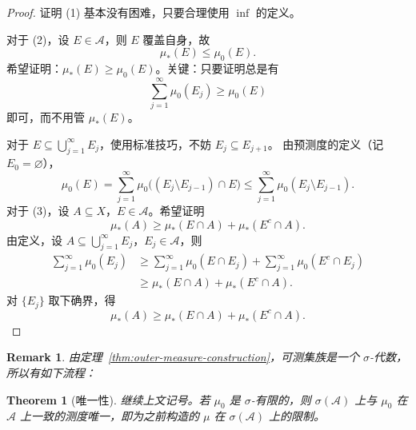 \documentclass[12pt,letterpaper,twoside,openright]{ctexbook}
\theoremstyle{bluehead}
\newtheorem{theorem}{Theorem}
\theoremstyle{olivehead}
\theoremstyle{orangehead}
\theoremstyle{redremark}
\newtheorem*{remark}{Remark}
\begin{document}
\begin{proof}
证明 \textup{(1)} 基本没有困难，只要合理使用 $\inf$ 的定义。

对于 \textup{(2)}，设 $E\in\mathcal{A}$，则 $E$ 覆盖自身，故
\[
  \mu_*(E)\leq\mu_0(E).
\]
希望证明：$\mu_*(E)\geq\mu_0(E)$。关键：只要证明总是有
\[
  \sum_{j=1}^{\infty}\mu_0(E_j)\geq\mu_0(E)
\]
即可，而不用管 $\mu_*(E)$。

对于 $E\subseteq\bigcup_{j=1}^{\infty}E_j$，使用标准技巧，不妨 $E_j\subseteq E_{j+1}$。
由预测度的定义（记 $E_0=\varnothing$），
\[
  \mu_0(E)
  =\sum_{j=1}^{\infty}\mu_0\bigl((E_j\setminus E_{j-1})\cap E\bigr)
  \leq\sum_{j=1}^{\infty}\mu_0(E_j\setminus E_{j-1}).
\]
对于 \textup{(3)}，设 $A\subseteq X$，$E\in\mathcal{A}$。希望证明
\[
  \mu_*(A)\geq\mu_*(E\cap A)+\mu_*(E^c\cap A).
\]
由定义，设 $A\subseteq\bigcup_{j=1}^{\infty}E_j$，$E_j\in\mathcal{A}$，则
\[
\begin{aligned}
  \sum_{j=1}^{\infty}\mu_0(E_j)
  &\geq\sum_{j=1}^{\infty}\mu_0(E\cap E_j)
      +\sum_{j=1}^{\infty}\mu_0(E^c\cap E_j)\\
  &\geq\mu_*(E\cap A)+\mu_*(E^c\cap A).
\end{aligned}
\]
对 $\{E_j\}$ 取下确界，得
\[
  \mu_*(A)\geq\mu_*(E\cap A)+\mu_*(E^c\cap A).
\]
\end{proof}
\begin{remark}
由定理~\ref{thm:outer-measure-construction}，可测集族是一个 $\sigma$-代数，所以有如下流程：
\begin{center}
\end{center}
\end{remark}
\begin{theorem}[唯一性]\label{thm:measure-extension-uniqueness}
继续上文记号。若 $\mu_0$ 是 $\sigma$-有限的，则 $\sigma(\mathcal{A})$ 上与 $\mu_0$ 在 $\mathcal{A}$ 上一致的测度唯一，即为之前构造的 $\mu$ 在 $\sigma(\mathcal{A})$ 上的限制。
\end{theorem}
\end{document}
